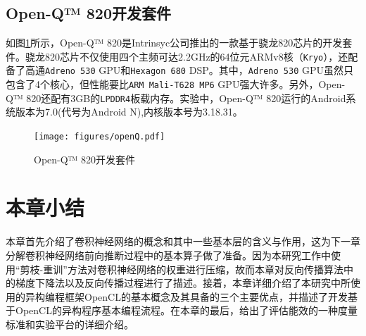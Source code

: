 \subsection{Open-Q™ 820开发套件}

如图\ref{figure:figureopenQ}所示，Open-Q™ 820是Intrinsyc公司推出的一款基于骁龙820芯片的开发套件。骁龙820芯片不仅使用四个主频可达2.2GHz的64位元ARMv8核（\texttt{Kryo}），还配备了高通\texttt{Adreno 530} GPU和\texttt{Hexagon 680} DSP。其中，\texttt{Adreno 530} GPU虽然只包含了4个核心，但性能要比\texttt{ARM Mali-T628 MP6} GPU强大许多。另外，Open-Q™ 820还配有3GB的\texttt{LPDDR4}板载内存。实验中，Open-Q™ 820运行的Android系统版本为7.0(代号为Android N),内核版本号为3.18.31。

\begin{figure}[htbp]
    \begin{center}
    \texttt{[image: figures/openQ.pdf]}
    \end{center}
    \caption{Open-Q™ 820开发套件}\label{figure:figureopenQ}
\end{figure}


\section{本章小结}

本章首先介绍了卷积神经网络的概念和其中一些基本层的含义与作用，这为下一章分解卷积神经网络前向推断过程中的基本算子做了准备。因为本研究工作中使用“剪枝-重训”方法对卷积神经网络的权重进行压缩，故而本章对反向传播算法中的梯度下降法以及反向传播过程进行了描述。接着，本章详细介绍了本研究中所使用的异构编程框架OpenCL的基本概念及其具备的三个主要优点，并描述了开发基于OpenCL的异构程序基本编程流程。在本章的最后，给出了评估能效的一种度量标准和实验平台的详细介绍。

\cleardoublepage 